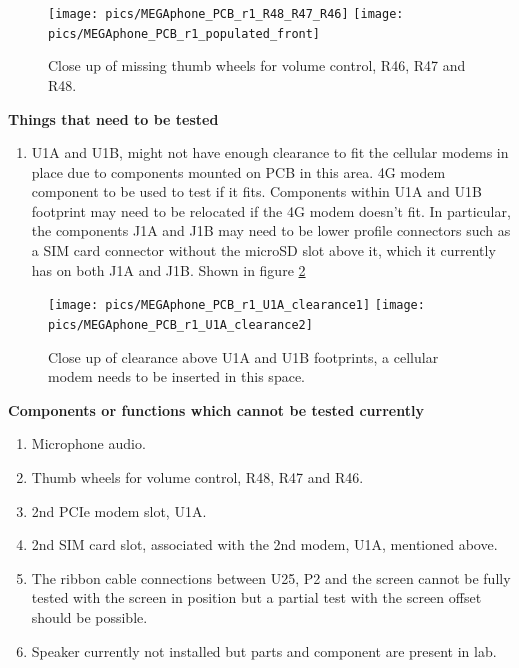 \begin{figure} \begin{center}
\texttt{[image: pics/MEGAphone\_PCB\_r1\_R48\_R47\_R46]}
\texttt{[image: pics/MEGAphone\_PCB\_r1\_populated\_front]}
\end{center} 
\caption{Close up of missing thumb wheels for volume control, R46, R47 and R48. \\}
\label{MEGAphone_PCB_r1_R49_R48_R47}
\end{figure}

\textbf{Things that need to be tested}
\begin{enumerate}
\item U1A and U1B, might not have enough clearance to fit the cellular modems in place due to components mounted on PCB in this area. 4G modem component to be used to test if it fits. Components within U1A and U1B footprint may need to be relocated if the 4G modem doesn't fit. In particular, the components J1A and J1B may need to be lower profile connectors such as a SIM card connector without the microSD slot above it, which it currently has on both J1A and J1B. Shown in figure \ref{MEGAphone_PCB_r1_U1A_clearance} \\
\end{enumerate}

\begin{figure} \begin{center}
\texttt{[image: pics/MEGAphone\_PCB\_r1\_U1A\_clearance1]}
\texttt{[image: pics/MEGAphone\_PCB\_r1\_U1A\_clearance2]}
\end{center} 
\caption{Close up of clearance above U1A and U1B footprints, a cellular modem needs to be inserted in this space. \\}
\label{MEGAphone_PCB_r1_U1A_clearance}
\end{figure}


\textbf{Components or functions which cannot be tested currently}
\begin{enumerate}
\item Microphone audio.
\item Thumb wheels for volume control, R48, R47 and R46.
\item 2nd PCIe modem slot, U1A.
\item 2nd SIM card slot, associated with the 2nd modem, U1A, mentioned above.
\item The ribbon cable connections between U25, P2 and the screen cannot be fully tested with the screen in position but a partial test with the screen offset should be possible.
\item Speaker currently not installed but parts and component are present in lab. \\
\end{enumerate}

